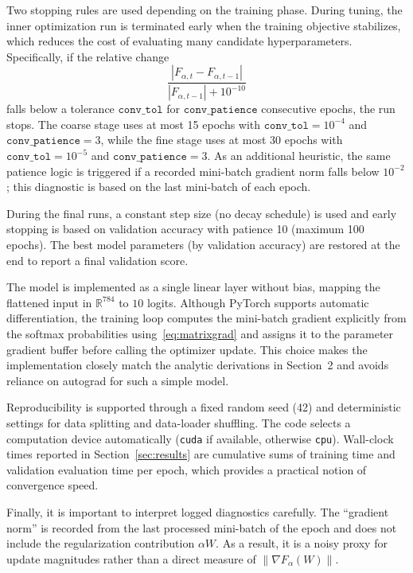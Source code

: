 \documentclass[11pt]{article}
\numberwithin{equation}{section}
\numberwithin{table}{section}
\numberwithin{figure}{section}
\numberwithin{algorithm}{section}
\begin{document}
Two stopping rules are used depending on the training phase. During tuning, the inner optimization run is terminated early when the training objective stabilizes, which reduces the cost of evaluating many candidate hyperparameters. Specifically, if the relative change
\[
\frac{|F_{\alpha,t}-F_{\alpha,t-1}|}{|F_{\alpha,t-1}|+10^{-10}}
\]
falls below a tolerance \(\texttt{conv\_tol}\) for \(\texttt{conv\_patience}\) consecutive epochs, the run stops. The coarse stage uses at most 15 epochs with \(\texttt{conv\_tol}=10^{-4}\) and \(\texttt{conv\_patience}=3\), while the fine stage uses at most 30 epochs with \(\texttt{conv\_tol}=10^{-5}\) and \(\texttt{conv\_patience}=3\). As an additional heuristic, the same patience logic is triggered if a recorded mini-batch gradient norm falls below \(10^{-2}\); this diagnostic is based on the last mini-batch of each epoch.

During the final runs, a constant step size (no decay schedule) is used and early stopping is based on validation accuracy with patience 10 (maximum 100 epochs). The best model parameters (by validation accuracy) are restored at the end to report a final validation score.

The model is implemented as a single linear layer without bias, mapping the flattened input in \(\mathbb{R}^{784}\) to \(10\) logits. Although PyTorch supports automatic differentiation, the training loop computes the mini-batch gradient explicitly from the softmax probabilities using~\eqref{eq:matrixgrad} and assigns it to the parameter gradient buffer before calling the optimizer update. This choice makes the implementation closely match the analytic derivations in Section~2 and avoids reliance on autograd for such a simple model.

Reproducibility is supported through a fixed random seed (42) and deterministic settings for data splitting and data-loader shuffling. The code selects a computation device automatically (\texttt{cuda} if available, otherwise \texttt{cpu}). Wall-clock times reported in Section~\ref{sec:results} are cumulative sums of training time and validation evaluation time per epoch, which provides a practical notion of convergence speed.

Finally, it is important to interpret logged diagnostics carefully. The ``gradient norm'' is recorded from the last processed mini-batch of the epoch and does not include the regularization contribution \(\alpha W\). As a result, it is a noisy proxy for update magnitudes rather than a direct measure of \(\lVert\nabla F_\alpha(W)\rVert\).
\end{document}
